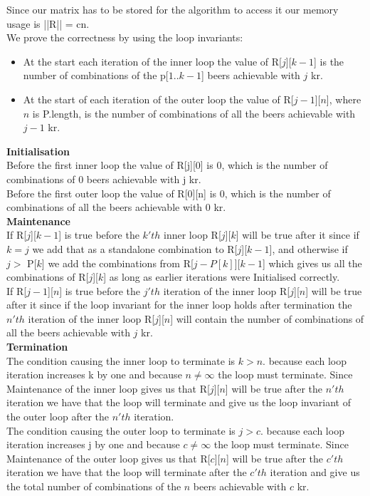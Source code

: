 \documentclass[12pt]{article}
\begin{document}
Since our matrix has to be stored for the algorithm to access it our memory usage is ||R|| = cn.\\

We prove the correctness by using the loop invariants:
\begin{itemize}
\item At the start each iteration of the inner loop the value of R[$j$][$k-1$] is the number of combinations of the p[$1..k-1$] beers achievable with $j$ kr.
\item At the start of each iteration of the outer loop the value of R[$j-1$][$n$], where $n$ is P.length, is the number of combinations of all the beers achievable with $j-1$ kr.

\end{itemize}

\textbf{Initialisation}\\
Before the first inner loop the value of R[j][0] is 0, which is the number of combinations of 0 beers achievable with j kr.\\

Before the first outer loop the value of R[0][n] is 0, which is the number of combinations of all the beers achievable with 0 kr.\\

\textbf{Maintenance}\\

If R[$j$][$k-1$] is true before the $k'th$ inner loop R[$j$][$k$] will be true after it since if $k = j$ we add that as a standalone combination to R[$j$][$k-1$], and otherwise if $j>$ P[$k$] we add the combinations from R[$j-P[k]$][$k-1$] which gives us all the combinations of R[$j$][$k$] as long as earlier iterations were Initialised correctly.\\

If R[$j-1$][$n$] is true before the $j'th$ iteration of the inner loop R[$j$][$n$] will be true after it since if the loop invariant for the inner loop holds after termination the $n'th$ iteration of the inner loop R[$j$][$n$] will contain the number of combinations of all the beers achievable with $j$ kr.\\

\textbf{Termination}\\

The condition causing the inner loop to terminate is $k > n$. because each loop iteration increases k by one and because $n \neq \infty$ the loop must terminate. Since Maintenance of the inner loop gives us that R[$j$][$n$] will be true after the $n'th$ iteration we have that the loop will terminate and give us the loop invariant of the outer loop after the $n'th$ iteration.\\

The condition causing the outer loop to terminate is $j > c$. because each loop iteration increases j by one and because $c \neq \infty$ the loop must terminate. Since Maintenance of the outer loop gives us that R[$c$][$n$] will be true after the $c'th$ iteration we have that the loop will terminate after the $c'th$  iteration and give us the total number of combinations of the $n$ beers achievable with $c$ kr.\\



\end{document}
